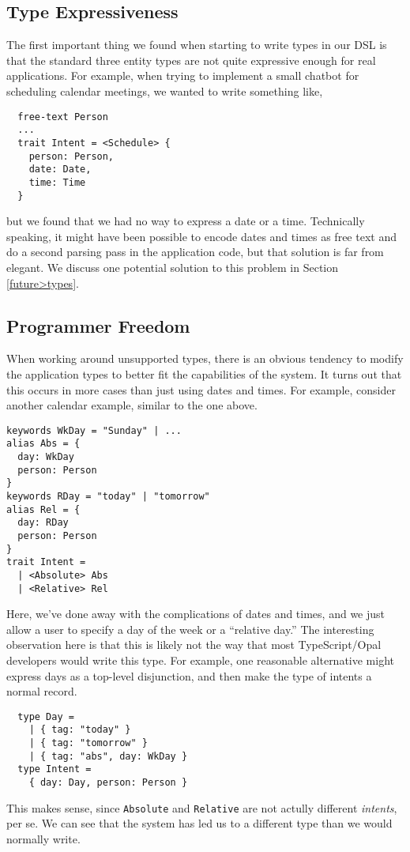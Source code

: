 \documentclass[twocolumn]{article}
\newcommand{\ts}[1]{\texttt{#1}}
\begin{document}
\subsection{Type Expressiveness}
The first important thing we found when starting to write types in our DSL is
that the standard three entity types are not quite expressive enough for real
applications. For example, when trying to implement a small chatbot for
scheduling calendar meetings, we wanted to write something like,
\begin{verbatim}
  free-text Person
  ...
  trait Intent = <Schedule> {
    person: Person,
    date: Date,
    time: Time
  }
\end{verbatim}
but we found that we had no way to express a date or a time. Technically
speaking, it might have been possible to encode dates and times as free text and
do a second parsing pass in the application code, but that solution is far from
elegant. We discuss one potential solution to this problem in Section
\ref{future>types}.

\subsection{Programmer Freedom}
When working around unsupported types, there is an obvious tendency to modify
the application types to better fit the capabilities of the system. It turns out
that this occurs in more cases than just using dates and times. For example,
consider another calendar example, similar to the one above.
\begin{verbatim}
keywords WkDay = "Sunday" | ...
alias Abs = {
  day: WkDay
  person: Person
}
keywords RDay = "today" | "tomorrow"
alias Rel = {
  day: RDay
  person: Person
}
trait Intent =
  | <Absolute> Abs
  | <Relative> Rel
\end{verbatim}
Here, we've done away with the complications of dates and times, and we just
allow a user to specify a day of the week or a ``relative day.'' The interesting
observation here is that this is likely not the way that most TypeScript/Opal
developers would write this type. For example, one reasonable alternative might
express days as a top-level disjunction, and then make the type of intents a
normal record.
\begin{verbatim}
  type Day =
    | { tag: "today" }
    | { tag: "tomorrow" }
    | { tag: "abs", day: WkDay }
  type Intent =
    { day: Day, person: Person }
\end{verbatim}
This makes sense, since \ts{Absolute} and \ts{Relative} are not actully
different \emph{intents}, per se. We can see that the system has led us to a
different type than we would normally write.
\end{document}
